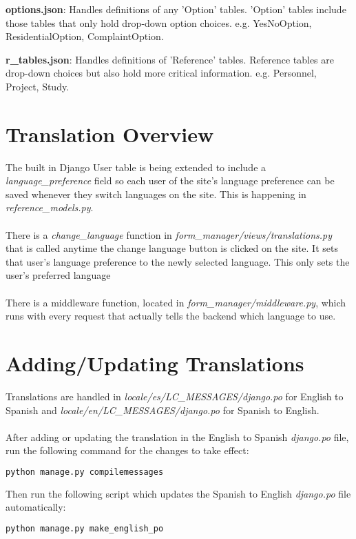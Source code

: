 \documentclass{article}
\begin{document}
\textbf{options.json}: Handles definitions of any 'Option' tables.  'Option' tables include those tables that only hold drop-down option choices. e.g. YesNoOption, ResidentialOption, ComplaintOption.

\textbf{r\_tables.json}: Handles definitions of 'Reference' tables.  Reference tables are drop-down choices but also hold more critical information.  e.g. Personnel, Project, Study.

\section{Translation Overview}
The built in Django User table is being extended to include a \textit{language\_preference} field so each user of the site's language preference can be saved whenever they switch languages on the site. This is happening in \textit{reference\_models.py}.
\\\\There is a \textit{change\_language} function in \textit{form\_manager/views/translations.py} that is called anytime the change language button is clicked on the site.  It sets that user's language preference to the newly selected language.  This only sets the user's preferred language
\\\\There is a middleware function, located in \textit{form\_manager/middleware.py}, which runs with every request that actually tells the backend which language to use.

\section{Adding/Updating Translations}
Translations are handled in \textit{locale/es/LC\_MESSAGES/django.po} for English to Spanish and \textit{locale/en/LC\_MESSAGES/django.po} for Spanish to English. 
\\\\After adding or updating the translation in the English to Spanish \textit{django.po} file, run the following command for the changes to take effect:
\begin{lstlisting}[language=bash]
  python manage.py compilemessages
\end{lstlisting}
Then run the following script which updates the Spanish to English \textit{django.po} file automatically:
\begin{lstlisting}[language=bash]
  python manage.py make_english_po
\end{lstlisting}
\end{document}
